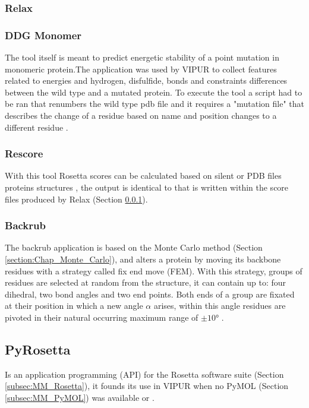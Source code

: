\subsubsection{Relax}
\label{subsubsec:MM_Relax}

\subsubsection{DDG Monomer}
The tool itself is meant to predict energetic stability of a point mutation in  monomeric protein.The application was used by VIPUR to collect features related to energies and hydrogen, disfulfide, bonds and constraints differences between the wild type and a mutated protein. To execute the tool a script had to be ran that renumbers the wild type pdb file and it requires a "mutation file" that describes the change of a residue based on name and position changes to a different residue \cite{}.
\label{subsubsec:MM_DDG_Monomer}

\subsubsection{Rescore}
With this tool Rosetta scores can be calculated based on silent or PDB files proteins structures \cite{} , the output is identical to that is written within the score files produced by Relax (Section \ref{subsubsec:MM_Relax}).
\label{subsubsec:MM_Rescore}

\subsubsection{Backrub}
The backrub application is based on the Monte Carlo method (Section \ref{section:Chap_Monte_Carlo}), and alters a protein by moving its backbone residues with a strategy called fix end move (FEM). With this strategy, groups of residues are selected at random from the structure, it can contain up to: four dihedral, two bond angles and two end points. Both ends of a group are fixated at their position in which a new angle $\alpha$ arises, within this angle residues are pivoted in their natural occurring maximum range of $\pm \ang{10}$ \cite{}.
\label{subsubsec:MM_Backrub}

\subsection{PyRosetta}
Is an application programming (API) for the Rosetta software suite (Section \ref{subsec:MM_Rosetta}), it founds its use in VIPUR when no PyMOL (Section \ref{subsec:MM_PyMOL}) was available or .  
\label{subsec:MM_PyRosetta}

